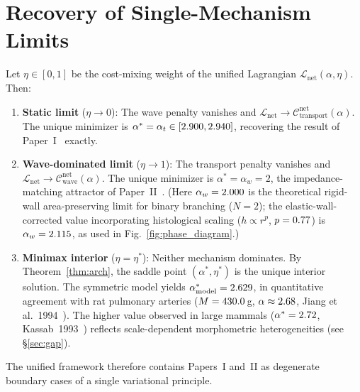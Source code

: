 
\section{Recovery of Single-Mechanism Limits}

\begin{corollary}
Let $\eta \in [0,1]$ be the cost-mixing weight of the unified Lagrangian
$\mathcal{L}_{\mathrm{net}}(\alpha, \eta)$. Then:
\begin{enumerate}
    \item
\textbf{Static limit} ($\eta \to 0$): The wave penalty vanishes and
$\mathcal{L}_{\mathrm{net}} \to
\mathcal{C}_{\mathrm{transport}}^{\mathrm{net}}(\alpha)$. The unique minimizer
is $\alpha^* = \alpha_t \in [2.900, 2.940]$, recovering the
result of Paper~I~\cite{paperI} exactly.
    \item
\textbf{Wave-dominated limit} ($\eta \to 1$): The transport penalty vanishes and
$\mathcal{L}_{\mathrm{net}} \to
\mathcal{C}_{\mathrm{wave}}^{\mathrm{net}}(\alpha)$. The unique minimizer is
$\alpha^* = \alpha_w = 2$, the impedance-matching attractor of
Paper~II~\cite{paperII}. (Here $\alpha_w = 2.000$ is the theoretical
rigid-wall area-preserving limit for binary branching ($N=2$); the
elastic-wall-corrected value incorporating histological scaling ($h \propto
r^p$, $p = 0.77$) is $\alpha_w = 2.115$, as used in
Fig.~\ref{fig:phase_diagram}.)
    \item
\textbf{Minimax interior} ($\eta = \eta^*$): Neither mechanism dominates. By
Theorem~\ref{thm:arch}, the saddle point $(\alpha^*, \eta^*)$ is the unique
interior solution. The symmetric model yields $\alpha^*_{\mathrm{model}} =
2.629$, in quantitative agreement with rat pulmonary arteries
($M=430.0\,$g, $\alpha \approx 2.68$, Jiang et
al.~1994~\cite{jiang1994}). The higher value observed in large mammals
($\alpha^* = 2.72$, Kassab~1993~\cite{kassab1993}) reflects
scale-dependent morphometric heterogeneities (see \S\ref{sec:gap}).
\end{enumerate}
The unified framework therefore contains Papers~I and~II as degenerate boundary
cases of a single variational principle.
\end{corollary}

